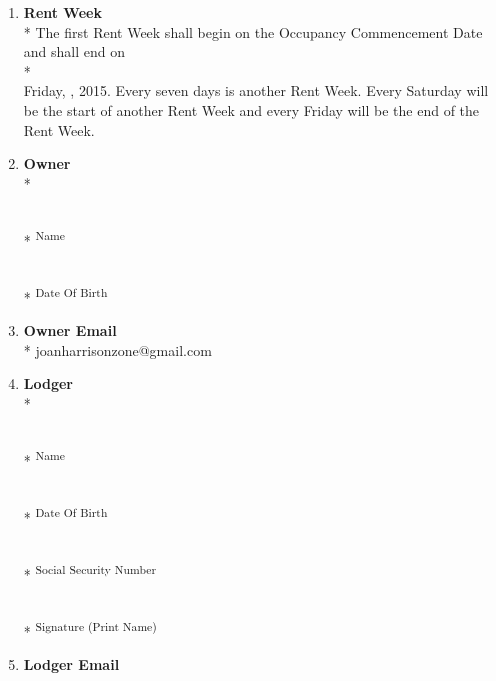 \documentclass[12pt,letterpaper]{article}
\newcommand{\datefillin}{\hspace{0.2cm}\makebox[3cm]{\hrulefill}}
\newcommand{\lodger}{Lodger}
\newcommand{\ownermail}{Owner Email}
\newcommand{\firstday}{Occupancy Commencement Date}
\newcommand{\rentweek}{Rent Week}
\newcommand{\lemail}{Lodger Email}
\begin{document}
\begin{multicols}{2}
\begin{enumerate}
			\item \textbf{\rentweek{}}\\* \label{rentweek}
				The first \rentweek{} shall begin on the \firstday{} and shall end on \\* \\
				Friday, \datefillin, 2015. Every seven days is another \rentweek{}. Every Saturday will be the start of another \rentweek{} and every Friday will be the end of the \rentweek{}.
				
			\item \textbf{Owner}\\* \label{owner}
				\begin{minipage}[t]{2in}

					\vspace{0.5cm}\makebox[2in]{\hrulefill} \\*
					\textsuperscript{Name}
					
					\vspace{0.5cm}\makebox[2in]{\hrulefill} \\*
					\textsuperscript{Date Of Birth}
				\end{minipage}%

			\item \textbf{\ownermail{}}\\* \label{ownermail}
				joanharrisonzone@gmail.com

			\item \textbf{\lodger{}}\\* \label{lodger}
				\begin{minipage}[t]{2in}

					\vspace{0.5cm}\makebox[2in]{\hrulefill} \\*
					\textsuperscript{Name}
					
					\vspace{0.5cm}\makebox[2in]{\hrulefill} \\*
					\textsuperscript{Date Of Birth}
					
					\vspace{0.5cm}\makebox[2in]{\hrulefill} \\*
					\textsuperscript{Social Security Number}
					
					\vspace{0.5cm}\makebox[2in]{\hrulefill} \\*
					\textsuperscript{Signature (Print Name)}
				\end{minipage}%

			\item \textbf{\lemail{}} \label{lemail}

				\vspace{0.5cm}\makebox[2in]{\hrulefill}

				\vspace{0.5cm}\makebox[2in]{\hrulefill}
		\end{enumerate}
	\end{multicols}
\end{document}
